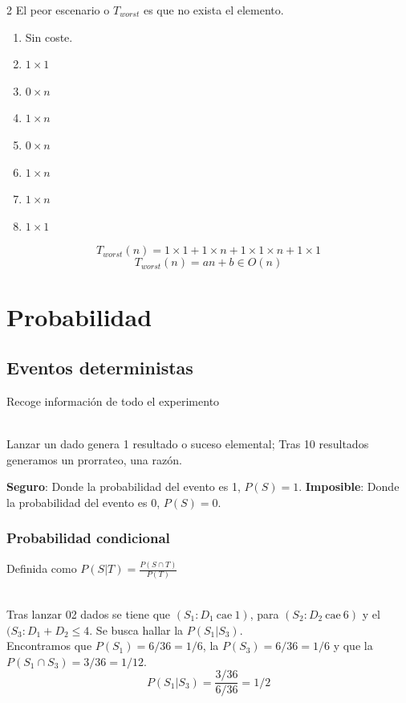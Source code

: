 \documentclass[tikz,11pt,fleqn]{book} %
\begin{document}
\begin{example}
\begin{multicols}{2}
        \columnbreak
        El peor escenario o $T_{worst}$ es que no exista el elemento.
        \begin{enumerate}
            \item Sin coste.
            \item $1\times1$
            \item $0\times n$
            \item $1\times n$
            \item $0\times n$
            \item $1\times n$
            \item $1\times n$
            \item $1\times1$
        \end{enumerate}
    \end{multicols}
    $$
        T_{worst}(n)= 1\times1+1\times n+1\times 1\times n+1\times1
    $$ $$
        T_{worst}(n)= an+b\in O(n)
    $$
\end{example}


\section{Probabilidad}
\subsection{Eventos deterministas}
\begin{definition}
    Recoge información de todo el experimento
    \begin{example}[Dados]~
        \\Lanzar un dado genera 1 resultado o suceso elemental; Tras 10 resultados generamos un prorrateo, una razón.
    \end{example}
\end{definition}

\begin{definition}[Sucesos]
    \textbf{Seguro}: Donde la probabilidad del evento es 1, $P(S)=1$.
    \textbf{Imposible}: Donde la probabilidad del evento es 0, $P(S)=0$.
\end{definition}

\subsubsection{Probabilidad condicional}
Definida como $P(S|T)=\frac{P(S\cap T)}{P(T)}$

\begin{example}[Dados]~
    \\Tras lanzar 02 dados se tiene que $(S_1:D_1~\text{cae}~1)$, para $(S_2:D_2~\text{cae}~6)$ y el $(S_3:D_1+D_2\le4$. Se busca hallar la $P(S_1|S_3)$.
    \\Encontramos que $P(S_1)=6/36=1/6$, la $P(S_3)=6/36=1/6$ y que la $P(S_1\cap S_3)=3/36=1/12$.
    $$
        P(S_1|S_3)=\frac{3/36}{6/36}=1/2
    $$
\end{example}
\end{document}
